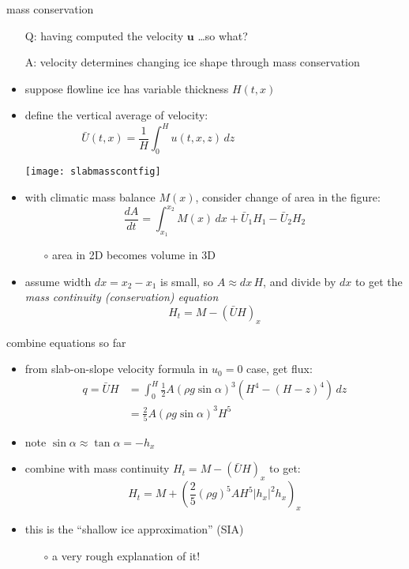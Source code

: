 \begin{frame}{mass conservation}

\small
\begin{itemize}
\item[Q:] having computed the velocity $\mathbf{u}$ \dots so what?
\item[A:] velocity determines changing ice shape through \alert{mass conservation}
\item suppose flowline ice has variable thickness $H(t,x)$
\item define the vertical average of velocity:
	$$\bar U(t,x) = \frac{1}{H}\int_0^{H} u(t,x,z)\,dz \phantom{sdlj asdlbj asldbfj asdlfj}$$

\vspace{-20mm}
\hfill \texttt{[image: slabmasscontfig]}
\item with climatic mass balance $M(x)$, consider change of area in the figure:
	$$\frac{dA}{dt} = \int_{x_1}^{x_2} M(x)\,dx + \bar U_1 H_1 - \bar U_2 H_2$$

    \vspace{-2mm}
    \begin{itemize}
    \item[$\circ$] area in 2D becomes volume in 3D
    \end{itemize}
\item assume width $dx=x_2-x_1$ is small, so $A\approx dx\, H$, and divide by $dx$ to get the  \emph{mass continuity (conservation) equation}
   $$H_t = M - \left(\bar U H\right)_x$$
\end{itemize}
\end{frame}


\begin{frame}{combine equations so far}

\begin{itemize}
\item from slab-on-slope velocity formula in $u_0=0$ case, get flux:
\begin{align*}
q = \bar U H &= \int_0^H \frac{1}{2} A (\rho g \sin\alpha)^3  \left(H^4 - (H-z)^4\right)\,dz \\
	&= \frac{2}{5} A (\rho g \sin\alpha)^3 H^5
\end{align*}
\item note $\sin \alpha \approx \tan\alpha = - h_x$
\item combine with mass continuity $H_t = M - \left(\bar U H\right)_x$ to get:
  $$H_t = M + \left(\frac{2}{5} (\rho g)^5 A H^5 |h_x|^2 h_x\right)_x$$

\medskip
\item this is the ``shallow ice approximation'' (SIA)
    \begin{itemize}
    \item[$\circ$] a very rough explanation of it!
    \end{itemize}
\end{itemize}
\end{frame}
